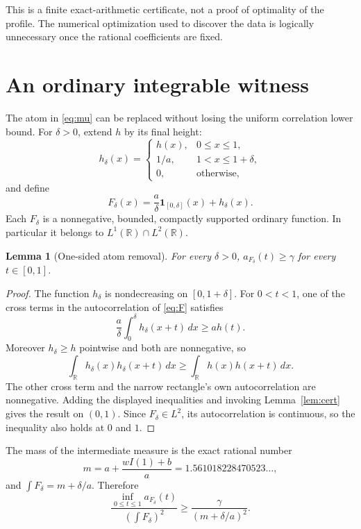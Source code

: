 \documentclass[11pt,a4paper]{article}
\newtheorem{lemma}[theorem]{Lemma}
\theoremstyle{remark}\newtheorem{remark}[theorem]{Remark}
\newcommand{\R}{\mathbb R}
\newcommand{\ind}{\mathbf 1}
\begin{document}
This is a finite exact-arithmetic certificate, not a proof of optimality of the profile. The numerical optimization used to discover the data is logically unnecessary once the rational coefficients are fixed.

\section{An ordinary integrable witness}\label{sec:function}
The atom in \eqref{eq:mu} can be replaced without losing the uniform correlation lower bound. For $\delta>0$, extend $h$ by its final height:
\[
 h_\delta(x)=\begin{cases}
 h(x),&0\le x\le1,\\
 1/a,&1<x\le1+\delta,\\
 0,&\text{otherwise},
 \end{cases}
\]
and define
\begin{equation}\label{eq:F}
 F_\delta(x)=\frac a\delta\ind_{[0,\delta]}(x)+h_\delta(x).
\end{equation}
Each $F_\delta$ is a nonnegative, bounded, compactly supported ordinary function. In particular it belongs to $L^1(\R)\cap L^2(\R)$.

\begin{lemma}[One-sided atom removal]\label{lem:removal}
For every $\delta>0$, $a_{F_\delta}(t)\ge\gamma$ for every $t\in[0,1]$.
\end{lemma}
\begin{proof}
The function $h_\delta$ is nondecreasing on $[0,1+\delta]$. For $0<t<1$, one of the cross terms in the autocorrelation of \eqref{eq:F} satisfies
\[
 \frac a\delta\int_0^\delta h_\delta(x+t)\,dx\ge a h(t).
\]
Moreover $h_\delta\ge h$ pointwise and both are nonnegative, so
\[
 \int_\R h_\delta(x)h_\delta(x+t)\,dx
 \ge\int_\R h(x)h(x+t)\,dx.
\]
The other cross term and the narrow rectangle's own autocorrelation are nonnegative. Adding the displayed inequalities and invoking Lemma~\ref{lem:cert} gives the result on $(0,1)$. Since $F_\delta\in L^2$, its autocorrelation is continuous, so the inequality also holds at $0$ and $1$.
\end{proof}

The mass of the intermediate measure is the exact rational number
\begin{equation}\label{eq:mass}
 m=a+\frac{wI(1)+b}{a}=1.561018228470523\ldots,
\end{equation}
and $\int F_\delta=m+\delta/a$. Therefore
\begin{equation}\label{eq:ratio}
 \frac{\inf_{0\le t\le1}a_{F_\delta}(t)}{(\int F_\delta)^2}
 \ge \frac\gamma{(m+\delta/a)^2}.
\end{equation}
\end{document}
